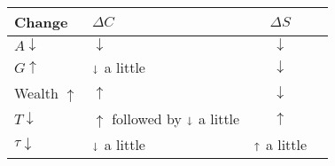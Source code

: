 \documentclass[letterpaper, 9pt,landscape]{extarticle}
\begin{document}
\begin{multicols*}{5}
\begin{remark}
    \begin{center}
    \begin{tabular}{l l c c}
    	\textbf{Change} & $\Delta C$ & $\Delta S$ \\\hline
    $A \downarrow$ & $\downarrow$ & $\downarrow$ \\
    $G \uparrow$ & $\shortdownarrow$ a little & $\downarrow$ \\
    Wealth $\uparrow$ & $\uparrow$ & $\downarrow$ \\
    $T \downarrow$ & $\uparrow$ followed by  $\shortdownarrow$ a little & $\uparrow$ \\
    $\tau \downarrow$ & $\shortdownarrow$ a little & $\shortuparrow$ a little \\
    \end{tabular}
    \end{center}
\end{remark}




\end{multicols*}
\end{document}
